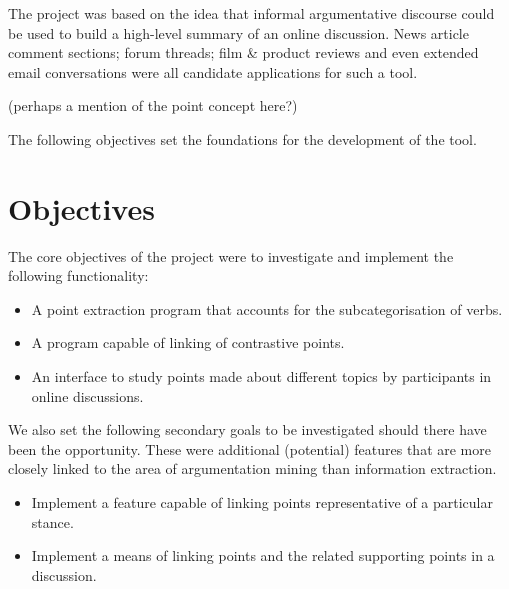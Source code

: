     The project was based on the idea that informal argumentative discourse could be used to build a high-level summary of an online discussion. News article comment sections; forum threads; film \& product reviews and even extended email conversations were all candidate applications for such a tool.

    (perhaps a mention of the point concept here?)

    The following objectives set the foundations for the development of the tool.

  \section{Objectives}
    The core objectives of the project were to investigate and implement the following functionality:
    \begin{itemize}
      \item{A point extraction program that accounts for the subcategorisation of verbs.}
      \item{A program capable of linking of contrastive points.}
      \item{An interface to study points made about different topics by participants in online discussions.}
    \end{itemize}
    We also set the following secondary goals to be investigated should there have been the opportunity. These were additional (potential) features that are more closely linked to the area of argumentation mining than information extraction.
    \begin{itemize}
      \item{Implement a feature capable of linking points representative of a particular stance.}
      \item{Implement a means of linking points and the related supporting points in a discussion.}
    \end{itemize}
